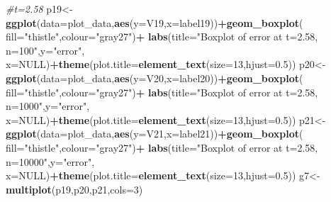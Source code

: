 \documentclass[
]{article}
\newenvironment{Shaded}{\begin{snugshade}}{\end{snugshade}}
\newcommand{\CommentTok}[1]{\textcolor[rgb]{0.56,0.35,0.01}{\textit{#1}}}
\newcommand{\DataTypeTok}[1]{\textcolor[rgb]{0.13,0.29,0.53}{#1}}
\newcommand{\DecValTok}[1]{\textcolor[rgb]{0.00,0.00,0.81}{#1}}
\newcommand{\FloatTok}[1]{\textcolor[rgb]{0.00,0.00,0.81}{#1}}
\newcommand{\KeywordTok}[1]{\textcolor[rgb]{0.13,0.29,0.53}{\textbf{#1}}}
\newcommand{\NormalTok}[1]{#1}
\newcommand{\OperatorTok}[1]{\textcolor[rgb]{0.81,0.36,0.00}{\textbf{#1}}}
\newcommand{\OtherTok}[1]{\textcolor[rgb]{0.56,0.35,0.01}{#1}}
\newcommand{\StringTok}[1]{\textcolor[rgb]{0.31,0.60,0.02}{#1}}
\begin{document}
\begin{Shaded}
\begin{Highlighting}[]
\CommentTok{#t=2.58}
\NormalTok{p19<-}\KeywordTok{ggplot}\NormalTok{(}\DataTypeTok{data=}\NormalTok{plot_data,}\KeywordTok{aes}\NormalTok{(}\DataTypeTok{y=}\NormalTok{V19,}\DataTypeTok{x=}\NormalTok{label19))}\OperatorTok{+}\KeywordTok{geom_boxplot}\NormalTok{(}
  \DataTypeTok{fill=}\StringTok{"thistle"}\NormalTok{,}\DataTypeTok{colour=}\StringTok{"gray27"}\NormalTok{)}\OperatorTok{+}
\StringTok{  }\KeywordTok{labs}\NormalTok{(}\DataTypeTok{title=}\StringTok{"Boxplot of error at t=2.58, n=100"}\NormalTok{,}\DataTypeTok{y=}\StringTok{"error"}\NormalTok{,}
       \DataTypeTok{x=}\OtherTok{NULL}\NormalTok{)}\OperatorTok{+}\KeywordTok{theme}\NormalTok{(}\DataTypeTok{plot.title=}\KeywordTok{element_text}\NormalTok{(}\DataTypeTok{size=}\DecValTok{13}\NormalTok{,}\DataTypeTok{hjust=}\FloatTok{0.5}\NormalTok{))}
\NormalTok{p20<-}\KeywordTok{ggplot}\NormalTok{(}\DataTypeTok{data=}\NormalTok{plot_data,}\KeywordTok{aes}\NormalTok{(}\DataTypeTok{y=}\NormalTok{V20,}\DataTypeTok{x=}\NormalTok{label20))}\OperatorTok{+}\KeywordTok{geom_boxplot}\NormalTok{(}
  \DataTypeTok{fill=}\StringTok{"thistle"}\NormalTok{,}\DataTypeTok{colour=}\StringTok{"gray27"}\NormalTok{)}\OperatorTok{+}
\StringTok{  }\KeywordTok{labs}\NormalTok{(}\DataTypeTok{title=}\StringTok{"Boxplot of error at t=2.58, n=1000"}\NormalTok{,}\DataTypeTok{y=}\StringTok{"error"}\NormalTok{,}
       \DataTypeTok{x=}\OtherTok{NULL}\NormalTok{)}\OperatorTok{+}\KeywordTok{theme}\NormalTok{(}\DataTypeTok{plot.title=}\KeywordTok{element_text}\NormalTok{(}\DataTypeTok{size=}\DecValTok{13}\NormalTok{,}\DataTypeTok{hjust=}\FloatTok{0.5}\NormalTok{))}
\NormalTok{p21<-}\KeywordTok{ggplot}\NormalTok{(}\DataTypeTok{data=}\NormalTok{plot_data,}\KeywordTok{aes}\NormalTok{(}\DataTypeTok{y=}\NormalTok{V21,}\DataTypeTok{x=}\NormalTok{label21))}\OperatorTok{+}\KeywordTok{geom_boxplot}\NormalTok{(}
  \DataTypeTok{fill=}\StringTok{"thistle"}\NormalTok{,}\DataTypeTok{colour=}\StringTok{"gray27"}\NormalTok{)}\OperatorTok{+}
\StringTok{  }\KeywordTok{labs}\NormalTok{(}\DataTypeTok{title=}\StringTok{"Boxplot of error at t=2.58, n=10000"}\NormalTok{,}\DataTypeTok{y=}\StringTok{"error"}\NormalTok{,}
       \DataTypeTok{x=}\OtherTok{NULL}\NormalTok{)}\OperatorTok{+}\KeywordTok{theme}\NormalTok{(}\DataTypeTok{plot.title=}\KeywordTok{element_text}\NormalTok{(}\DataTypeTok{size=}\DecValTok{13}\NormalTok{,}\DataTypeTok{hjust=}\FloatTok{0.5}\NormalTok{))}
\NormalTok{g7<-}\KeywordTok{multiplot}\NormalTok{(p19,p20,p21,}\DataTypeTok{cols=}\DecValTok{3}\NormalTok{)}


\end{Highlighting}
\end{Shaded}
\end{document}
